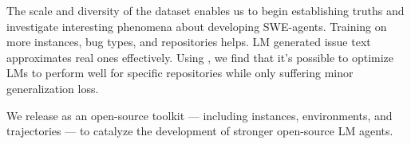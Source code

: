 The scale and diversity of the \bugs{} dataset enables us to begin establishing truths and investigate interesting phenomena about developing SWE-agents.
Training on more instances, bug types, and repositories helps.
LM generated issue text approximates real ones effectively.
Using \bugs{}, we find that it's possible to optimize LMs to perform well for specific repositories while only suffering minor generalization loss.

We release \bugs{} as an open-source toolkit --- including instances, environments, and trajectories --- to catalyze the development of stronger open-source LM agents.
